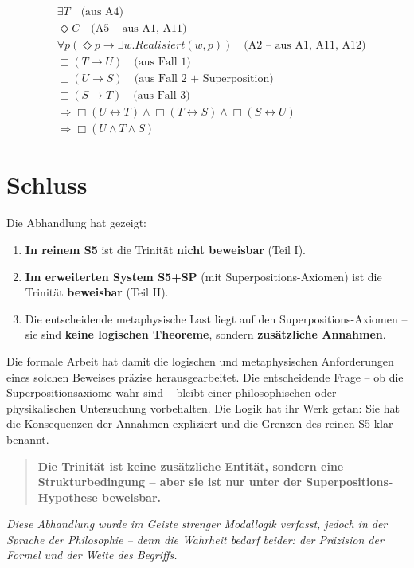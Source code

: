 \documentclass[
]{article}
\begin{document}
\[
\begin{aligned}
& \exists T \quad \text{(aus A4)} \\
& \Diamond C \quad \text{(A5 – aus A1, A11)} \\
& \forall p(\Diamond p \rightarrow \exists w. Realisiert(w,p)) \quad \text{(A2 – aus A1, A11, A12)} \\
& \Box(T \rightarrow U) \quad \text{(aus Fall 1)} \\
& \Box(U \rightarrow S) \quad \text{(aus Fall 2 + Superposition)} \\
& \Box(S \rightarrow T) \quad \text{(aus Fall 3)} \\
& \Rightarrow \Box(U \leftrightarrow T) \land \Box(T \leftrightarrow S) \land \Box(S \leftrightarrow U) \\
& \Rightarrow \Box(U \land T \land S)
\end{aligned}
\]

\section{Schluss}

Die Abhandlung hat gezeigt:

\begin{enumerate}
\item \textbf{In reinem S5} ist die Trinität \textbf{nicht beweisbar} (Teil I).
\item \textbf{Im erweiterten System S5+SP} (mit Superpositions-Axiomen) ist die Trinität \textbf{beweisbar} (Teil II).
\item Die entscheidende metaphysische Last liegt auf den Superpositions-Axiomen – sie sind \textbf{keine logischen Theoreme}, sondern \textbf{zusätzliche Annahmen}.
\end{enumerate}

Die formale Arbeit hat damit die logischen und metaphysischen Anforderungen eines solchen Beweises präzise herausgearbeitet. Die entscheidende Frage – ob die Superpositionsaxiome wahr sind – bleibt einer philosophischen oder physikalischen Untersuchung vorbehalten. Die Logik hat ihr Werk getan: Sie hat die Konsequenzen der Annahmen expliziert und die Grenzen des reinen S5 klar benannt.

\begin{quote}
\textbf{Die Trinität ist keine zusätzliche Entität, sondern eine Strukturbedingung – aber sie ist nur unter der Superpositions-Hypothese beweisbar.}
\end{quote}

\begin{center}
\emph{Diese Abhandlung wurde im Geiste strenger Modallogik verfasst, jedoch in der Sprache der Philosophie – denn die Wahrheit bedarf beider: der Präzision der Formel und der Weite des Begriffs.}
\end{center}
\end{document}
